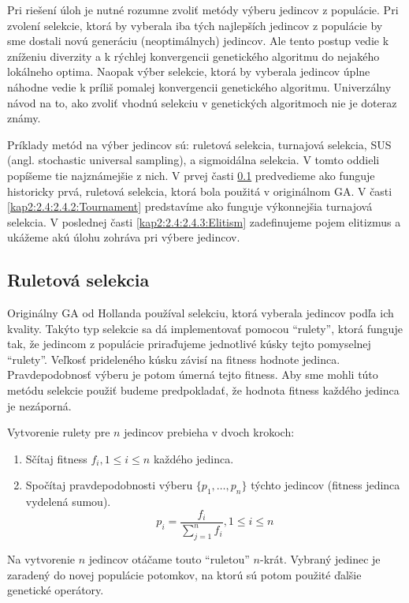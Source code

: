 Pri riešení úloh je nutné rozumne zvoliť metódy výberu jedincov z populácie. Pri zvolení selekcie, ktorá by vyberala iba tých najlepších jedincov z populácie by sme dostali novú generáciu (neoptimálnych) jedincov. Ale tento postup vedie k zníženiu diverzity a k rýchlej konvergencii genetického algoritmu do nejakého lokálneho optima. Naopak výber selekcie, ktorá by vyberala jedincov úplne náhodne vedie k príliš pomalej konvergencii genetického algoritmu. Univerzálny návod na to, ako zvoliť vhodnú selekciu v genetických algoritmoch nie je doteraz známy.

Príklady metód na výber jedincov sú: ruletová selekcia, turnajová selekcia, SUS (angl. stochastic universal sampling), a sigmoidálna selekcia. V tomto oddieli popíšeme tie najznámejšie z nich. V prvej časti \ref{kap2:2.4:2.4.1:RoulletteWheel} predvedieme ako funguje historicky prvá, ruletová selekcia, ktorá bola použitá v originálnom GA. V časti \ref{kap2:2.4:2.4.2:Tournament} predstavíme ako funguje výkonnejšia turnajová selekcia. V poslednej časti \ref{kap2:2.4:2.4.3:Elitism} zadefinujeme pojem elitizmus a ukážeme akú úlohu zohráva pri výbere jedincov.

\subsection{Ruletová selekcia}\label{kap2:2.4:2.4.1:RoulletteWheel}
Originálny GA od Hollanda používal selekciu, ktorá vyberala jedincov podľa ich kvality. Takýto typ selekcie sa dá implementovať pomocou ``rulety'', ktorá funguje tak, že jedincom z populácie priraďujeme jednotlivé kúsky tejto pomyselnej ``rulety''. Veľkosť prideleného kúsku závisí na fitness hodnote jedinca. Pravdepodobnosť výberu je potom úmerná tejto fitness. Aby sme mohli túto metódu selekcie použiť budeme predpokladať, že hodnota fitness každého jedinca je nezáporná.

Vytvorenie rulety pre $n$ jedincov prebieha v dvoch krokoch:
\begin{enumerate}
\item Sčítaj fitness $f_i, 1 \leq i \leq n$ každého jedinca.
\item Spočítaj pravdepodobnosti výberu $\{p_1,\ldots,p_n\}$ týchto jedincov (fitness jedinca vydelená sumou).
\begin{equation}
p_i = \dfrac{f_i}{\sum_{j=1}^{n}f_i}, 1 \leq i \leq n \nonumber
\end{equation}
\end{enumerate}
Na vytvorenie $n$ jedincov otáčame touto ``ruletou'' $n$-krát. Vybraný jedinec je zaradený do novej populácie potomkov, na ktorú sú potom použité ďalšie genetické operátory.
